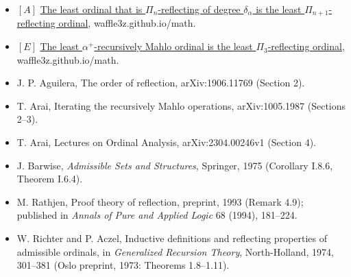 \documentclass[11pt]{article}
\begin{document}
\begin{itemize}
\item $[A]$ \href{https://waffle3z.github.io/math/degree-reflection.html}{The least ordinal that is $\Pi_n$-reflecting of
  degree $\delta_\alpha$ is the least $\Pi_{n+1}$-reflecting ordinal}, waffle3z.github.io/math.
\item $[E]$ \href{https://waffle3z.github.io/math/greatly-mahlo-pi3.html}{The least $\alpha^+$-recursively Mahlo ordinal
  is the least $\Pi_3$-reflecting ordinal}, waffle3z.github.io/math.
\item J. P. Aguilera, The order of reflection, arXiv:1906.11769 (Section 2).
\item T. Arai, Iterating the recursively Mahlo operations, arXiv:1005.1987 (Sections 2--3).
\item T. Arai, Lectures on Ordinal Analysis, arXiv:2304.00246v1 (Section 4).
\item J. Barwise, \emph{Admissible Sets and Structures}, Springer, 1975 (Corollary I.8.6, Theorem I.6.4).
\item M. Rathjen, Proof theory of reflection, preprint, 1993 (Remark 4.9); published in \emph{Annals of Pure and Applied
  Logic} 68 (1994), 181--224.
\item W. Richter and P. Aczel, Inductive definitions and reflecting properties of admissible ordinals, in
  \emph{Generalized Recursion Theory}, North-Holland, 1974, 301--381 (Oslo preprint, 1973: Theorems 1.8--1.11).
\end{itemize}
\end{document}
